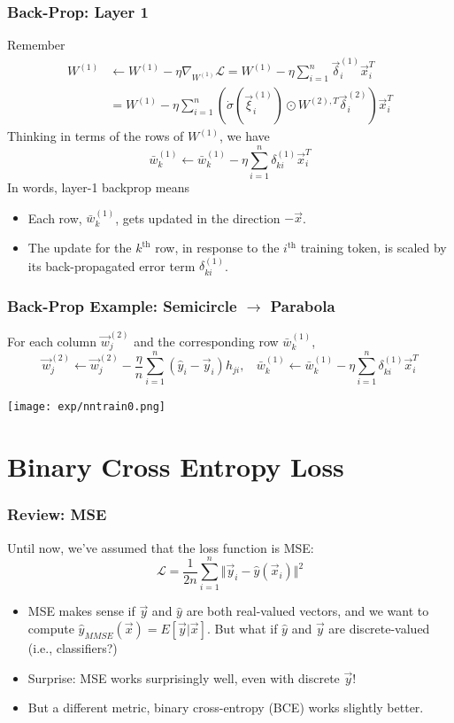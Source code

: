 \documentclass{beamer}
\begin{document}
\begin{frame}
  \frametitle{Back-Prop: Layer 1}
  Remember
  \begin{align*}
    W^{(1)} &\leftarrow W^{(1)}-\eta\nabla_{W^{(1)}}{\mathcal L}
    = W^{(1)}-\eta\sum_{i=1}^n \vec\delta^{(1)}_i\vec{x}_i^T\\
    &= W^{(1)}-\eta\sum_{i=1}^n \left(\dot\sigma(\vec\xi_i^{(1)})\odot W^{(2),T}\vec\delta^{(2)}_i\right)\vec{x}_i^T
  \end{align*}
  Thinking in terms of the rows of $W^{(1)}$, we have
  \[
  \bar{w}_k^{(1)} \leftarrow
  \bar{w}_k^{(1)}-\eta\sum_{i=1}^n\delta^{(1)}_{ki}\vec{x}_i^T
  \]
  In words, layer-1 backprop means
  \begin{itemize}
  \item Each row, $\bar{w}_k^{(1)}$, gets updated in the direction
    $-\vec{x}$.
  \item The update for the $k^{\textrm{th}}$ row, in response to
    the $i^{\textrm{th}}$ training token, is scaled by its
    back-propagated error term $\delta^{(1)}_{ki}$.
  \end{itemize}
\end{frame}

\begin{frame}
  \frametitle{Back-Prop Example: Semicircle $\rightarrow$ Parabola}
  For each column $\vec{w}_j^{(2)}$ and the corresponding row $\bar{w}_k^{(1)}$,
  \[
  \vec{w}_j^{(2)} \leftarrow
  \vec{w}_j^{(2)}-\frac{\eta}{n}\sum_{i=1}^n \left(\hat{y}_i-\vec{y}_i\right)h_{ji},~~~~
  \bar{w}_k^{(1)} \leftarrow
  \bar{w}_k^{(1)}-\eta\sum_{i=1}^n\delta^{(1)}_{ki}\vec{x}_i^T
  \]
  \centerline{\texttt{[image: exp/nntrain0.png]}}
\end{frame}

\section[BCE Loss]{Binary Cross Entropy  Loss}
\setcounter{subsection}{1}

\begin{frame}
  \frametitle{Review: MSE}
  
  Until now, we've assumed that the loss function is MSE:
  \[{\mathcal L} = \frac{1}{2n}\sum_{i=1}^n\Vert\vec{y}_{i}-\hat{y}(\vec{x}_i)\Vert^2 \]
  \begin{itemize}
  \item MSE makes sense if $\vec{y}$ and $\hat{y}$ are both
    real-valued vectors, and we want to compute
    $\hat{y}_{MMSE}(\vec{x})=E\left[\vec{y}|\vec{x}\right]$.  But
    what if $\hat{y}$ and $\vec{y}$ are discrete-valued (i.e.,
    classifiers?)
  \item Surprise: MSE works surprisingly well, even with
    discrete $\vec{y}$!
  \item But a different metric, binary cross-entropy (BCE) works
    slightly better.
  \end{itemize}
\end{frame}
\end{document}
